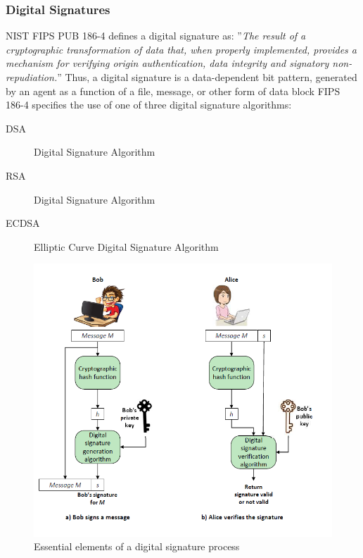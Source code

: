 \documentclass{article}
\begin{document}
                            \subsubsection{Digital Signatures}
                            NIST FIPS PUB 186-4 defines a digital signature as:
                                ”\textit{The result of a cryptographic transformation of data that,
                                when properly implemented, provides a mechanism for
                                verifying origin authentication, data integrity and signatory
                                non-repudiation.}” Thus, a digital signature is a data-dependent bit pattern, generated
                                by an agent as a function of a file, message, or other form of data
                                block FIPS 186-4 specifies the use of one of three digital signature
                                algorithms: 
                                \begin{description}
                                    \item[DSA] Digital Signature Algorithm  
                                    \item[RSA ] Digital Signature Algorithm
                                    \item[ ECDSA]Elliptic Curve Digital Signature Algorithm
                                \end{description}
                                \newpage
                                \begin{figure}
                                    \begin{center}
                                        \includegraphics[scale=0.5]{../immagini/signature_process.png}
                                    \end{center}
                                    \caption{Essential
                                    elements of a
                                    digital signature
                                    process}
                                \end{figure}
\end{document}
